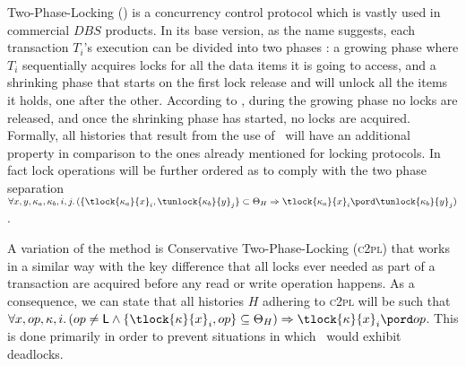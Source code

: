 Two-Phase-Locking (\tpl) is a concurrency control protocol which is vastly used in commercial $DBS$ products. In its base version, as the name suggests, each transaction $T_i$'s execution can be divided into two phases \cite{ccontrol}: a growing phase where $T_i$ sequentially acquires locks for all the data items it is going to access, and a shrinking phase that starts on the first lock release and will unlock all the items it holds, one after the other. According to \tpl, during the growing phase no locks are released, and once the shrinking phase has started, no locks are acquired. Formally, all histories that result from the use of \tpl\ will have an additional property in comparison to the ones already mentioned for locking protocols. In fact lock operations will be further ordered as to comply with the two phase separation $\forall x, y, \kappa_a, \kappa_b, i, j \ldotp (\{ \tlock{\kappa_a}{x}_i, \tunlock{\kappa_b}{y}_j \} \subset \Theta_H \Rightarrow \tlock{\kappa_a}{x}_i \pord \tunlock{\kappa_b}{y}_j)$.

A variation of the method is Conservative Two-Phase-Locking (\textsc{c2pl}) that works in a similar way with the key difference that all locks ever needed as part of a transaction are acquired before any read or write operation happens. As a consequence, we can state that all histories $H$ adhering to \textsc{c2pl} will be such that $\forall x, op, \kappa, i \ldotp (op \neq \textsf{L} \land \{ \tlock{\kappa}{x}_i, op \} \subseteq \Theta_H) \Rightarrow \tlock{\kappa}{x}_i \pord op$. This is done primarily in order to prevent situations in which \tpl\ would exhibit deadlocks.

